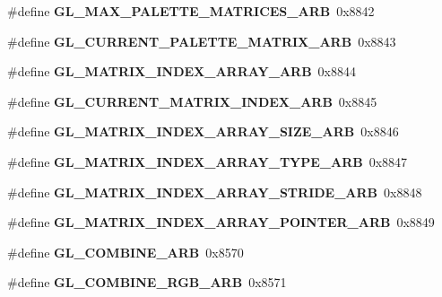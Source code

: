 \begin{DoxyCompactItemize}
\item 
\#define {\bfseries G\+L\+\_\+\+M\+A\+X\+\_\+\+P\+A\+L\+E\+T\+T\+E\+\_\+\+M\+A\+T\+R\+I\+C\+E\+S\+\_\+\+A\+R\+B}~0x8842\label{_s_d_l__opengl_8h_a01282453b2e4ebcc2d8ece6a5646e319}

\item 
\#define {\bfseries G\+L\+\_\+\+C\+U\+R\+R\+E\+N\+T\+\_\+\+P\+A\+L\+E\+T\+T\+E\+\_\+\+M\+A\+T\+R\+I\+X\+\_\+\+A\+R\+B}~0x8843\label{_s_d_l__opengl_8h_af0c2db233824e47ec30dd6a11d70196e}

\item 
\#define {\bfseries G\+L\+\_\+\+M\+A\+T\+R\+I\+X\+\_\+\+I\+N\+D\+E\+X\+\_\+\+A\+R\+R\+A\+Y\+\_\+\+A\+R\+B}~0x8844\label{_s_d_l__opengl_8h_a04104b6a38584f43d25b44c13d904ff3}

\item 
\#define {\bfseries G\+L\+\_\+\+C\+U\+R\+R\+E\+N\+T\+\_\+\+M\+A\+T\+R\+I\+X\+\_\+\+I\+N\+D\+E\+X\+\_\+\+A\+R\+B}~0x8845\label{_s_d_l__opengl_8h_a18926afe8b65f8804e000c77b8cf64ec}

\item 
\#define {\bfseries G\+L\+\_\+\+M\+A\+T\+R\+I\+X\+\_\+\+I\+N\+D\+E\+X\+\_\+\+A\+R\+R\+A\+Y\+\_\+\+S\+I\+Z\+E\+\_\+\+A\+R\+B}~0x8846\label{_s_d_l__opengl_8h_ad12b0f078eed21adfbab8c9b713e6c26}

\item 
\#define {\bfseries G\+L\+\_\+\+M\+A\+T\+R\+I\+X\+\_\+\+I\+N\+D\+E\+X\+\_\+\+A\+R\+R\+A\+Y\+\_\+\+T\+Y\+P\+E\+\_\+\+A\+R\+B}~0x8847\label{_s_d_l__opengl_8h_afbaaf55136ea6bd819538c93dfac4b2b}

\item 
\#define {\bfseries G\+L\+\_\+\+M\+A\+T\+R\+I\+X\+\_\+\+I\+N\+D\+E\+X\+\_\+\+A\+R\+R\+A\+Y\+\_\+\+S\+T\+R\+I\+D\+E\+\_\+\+A\+R\+B}~0x8848\label{_s_d_l__opengl_8h_a67e5345cb2e35088d0f12bf7ac7cda92}

\item 
\#define {\bfseries G\+L\+\_\+\+M\+A\+T\+R\+I\+X\+\_\+\+I\+N\+D\+E\+X\+\_\+\+A\+R\+R\+A\+Y\+\_\+\+P\+O\+I\+N\+T\+E\+R\+\_\+\+A\+R\+B}~0x8849\label{_s_d_l__opengl_8h_aff9e8093cdf852c0550e31395b41384c}

\item 
\#define {\bfseries G\+L\+\_\+\+C\+O\+M\+B\+I\+N\+E\+\_\+\+A\+R\+B}~0x8570\label{_s_d_l__opengl_8h_ad4c9f43d7ec9962afff14de8e1e26c4c}

\item 
\#define {\bfseries G\+L\+\_\+\+C\+O\+M\+B\+I\+N\+E\+\_\+\+R\+G\+B\+\_\+\+A\+R\+B}~0x8571\label{_s_d_l__opengl_8h_a11e172d19176c9dbc4a654f3ed0661d3}


\end{DoxyCompactItemize}
